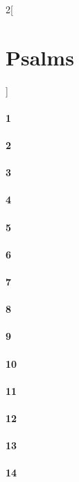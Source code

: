 \documentclass{book}
\begin{document}
\begin{multicols}{2}[\part{Psalms}]
\subsection*{1}
\subsection*{2}
\subsection*{3}
\subsection*{4}
\subsection*{5}
\subsection*{6}
\subsection*{7}
\subsection*{8}
\subsection*{9}
\subsection*{10}
\subsection*{11}
\subsection*{12}
\subsection*{13}
\subsection*{14}

\end{multicols}
\end{document}

